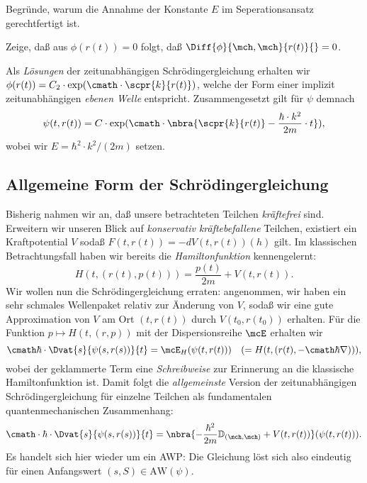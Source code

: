 \documentclass{subfiles}
\begin{document}
        \begin{Aufgabe}
            \nr{} Begründe, warum die Annahme der Konstante $E$ im Seperationsansatz gerechtfertigt ist.

            \nr{} Zeige, daß aus $\phi(r(t)) = 0$ folgt, daß $\Diff{\phi}{\mch,\mch}{r(t)}{} = 0$.
        \end{Aufgabe}
        Als \emph{Lösungen} der zeitunabhängigen Schrödingergleichung erhalten wir $\phi(r(t)) = C_2\cdot\exp(\cmath\cdot\scpr{k}{r(t)})$, welche der Form einer implizit zeitunabhängigen \emph{ebenen Welle} entspricht. Zusammengesetzt gilt für $\psi$ demnach
        \[\psi(t,r(t)) = C\cdot\exp(\cmath\cdot\nbra{\scpr{k}{r(t)} - \frac{\hbar\cdot k^2}{2m}\cdot t}),\]
        wobei wir $E = \hbar^2\cdot k^2/(2m)$ setzen. 

    \subsection{Allgemeine Form der Schrödingergleichung}
        Bisherig nahmen wir an, daß unsere betrachteten Teilchen \emph{kräftefrei} sind. Erweitern wir unseren Blick auf \emph{konservativ kräftebefallene} Teilchen, existiert ein Kraftpotential $V$ sodaß $F(t,r(t)) = -dV(t,r(t))(h)$ gilt. Im klassischen Betrachtungsfall haben wir bereits die \emph{Hamiltonfunktion} kennengelernt:
        \[H(t,(r(t),p(t))) = \frac{p(t)}{2m} + V(t,r(t)).\]
        Wir wollen nun die Schrödingergleichung erraten: angenommen, wir haben ein sehr schmales Wellenpaket relativ zur Änderung von $V$, sodaß wir eine gute Approximation von $V$ am Ort $(t,r(t))$ durch $V(t_0,r(t_0))$ erhalten. Für die Funktion $p\mapsto H(t,(r,p))$ mit der Dispersionsreihe $\mcE$ erhalten wir
        \[\cmath\hbar\cdot\Dvat{s}{\psi(s,r(s))}{t} = \mcE_H(\psi(t,r(t)))\quad (= H(t,(r(t),-\cmath\hbar\nabla))),\]
        wobei der geklammerte Term eine \textit{Schreibweise} zur Erinnerung an die klassische Hamiltonfunktion ist. Damit folgt die \emph{allgemeinste} Version der zeitunabhängigen Schrödingergleichung für einzelne Teilchen als fundamentalen quantenmechanischen Zusammenhang:
        \[\cmath\cdot\hbar\cdot\Dvat{s}{\psi(s,r(s))}{t} = \nbra{-\frac{\hbar^2}{2m}\mathbb{D}_{(\mch,\mch)} + V(t,r(t))}(\psi(t,r(t))).\]
        Es handelt sich hier wieder um ein AWP: Die Gleichung löst sich also eindeutig für einen Anfangswert $(s,S)\in\text{AW}(\psi)$. 
\end{document}
